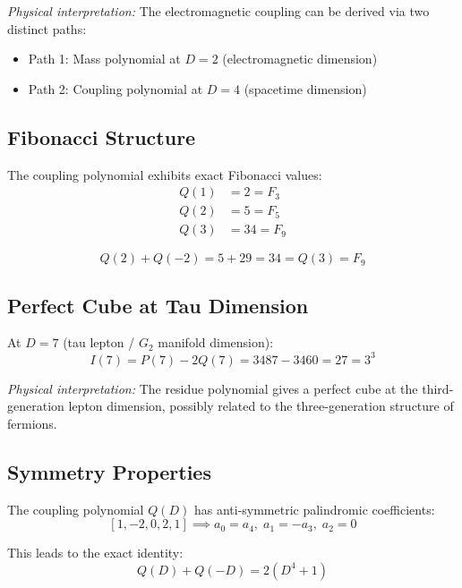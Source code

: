 \documentclass[11pt,a4paper]{article}
\begin{document}
\textit{Physical interpretation:} The electromagnetic coupling can be derived via two distinct paths:
\begin{itemize}
    \item Path 1: Mass polynomial at $D=2$ (electromagnetic dimension)
    \item Path 2: Coupling polynomial at $D=4$ (spacetime dimension)
\end{itemize}

\subsection{Fibonacci Structure}

The coupling polynomial exhibits exact Fibonacci values:
\begin{align}
Q(1) &= 2 = F_3 \\
Q(2) &= 5 = F_5 \\
Q(3) &= 34 = F_9
\end{align}

\begin{theorem}
\[
Q(2) + Q(-2) = 5 + 29 = 34 = Q(3) = F_9
\]
\end{theorem}

\subsection{Perfect Cube at Tau Dimension}

\begin{theorem}
At $D=7$ (tau lepton / $G_2$ manifold dimension):
\[
I(7) = P(7) - 2Q(7) = 3487 - 3460 = 27 = 3^3
\]
\end{theorem}

\textit{Physical interpretation:} The residue polynomial gives a perfect cube at the third-generation lepton dimension, possibly related to the three-generation structure of fermions.

\subsection{Symmetry Properties}

The coupling polynomial $Q(D)$ has anti-symmetric palindromic coefficients:
\[
[1, -2, 0, 2, 1] \implies a_0 = a_4, \; a_1 = -a_3, \; a_2 = 0
\]

This leads to the exact identity:
\[
Q(D) + Q(-D) = 2(D^4 + 1)
\]

\end{document}
